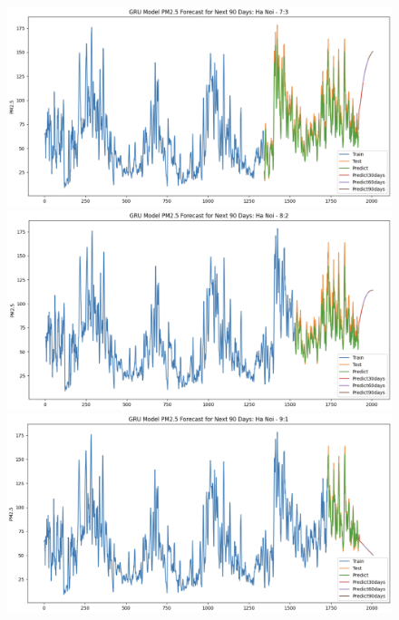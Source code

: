 \begin{figure}[H]
{\begin{adjustbox}{minipage=0.48\textwidth}
            \begin{minipage}{0.3\textwidth}
                \centering
                \includegraphics[width=\textwidth]{img/final/GRU/90D/GRU_7_3_HN.png}\\
                \includegraphics[width=\textwidth]{img/final/GRU/90D/GRU_8_2_HN.png}\\
                \includegraphics[width=\textwidth]{img/final/GRU/90D/GRU_9_1_HN.png}
            \end{minipage}\hfill
            \begin{minipage}{0.3\textwidth}

\end{minipage}
\end{adjustbox}}
\end{figure}
